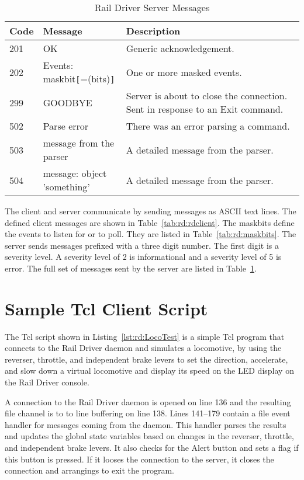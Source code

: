\begin{table}[hbpt]
\begin{centering}  
\begin{tabular}{|l|l|p{2in}|}
\hline
\textbf{Code} & \textbf{Message} & \textbf{Description} \\
\hline
\hline
201 & OK & Generic acknowledgement.\\
\hline
202 & Events: maskbit\verb=[==(bits)\verb=]=& One or more masked events.\\
\hline
299 & GOODBYE & Server is about to close the connection.  Sent in
response to an Exit command.\\
\hline
502 & Parse error& There was an error parsing a command.\\
\hline
503 & message from the parser& A detailed message from the parser.\\
\hline
504 & message: object 'something'& A detailed message from the parser.\\
\hline
\end{tabular}
\caption{Rail Driver Server Messages}
\label{tab:rd:rdserver}
\end{centering}
\end{table}
The client and server communicate by sending messages as ASCII text
lines.  The defined client messages are shown in
Table~\ref{tab:rd:rdclient}. The maskbits define the events to listen for
or to poll.  They are listed in Table~\ref{tab:rd:maskbits}. The server
sends messages prefixed with a three digit number.  The first digit is a
severity level. A severity level of 2 is informational and a
severity level of 5 is error.  The full set of messages sent by the
server are listed in Table~\ref{tab:rd:rdserver}.

\section{Sample Tcl Client Script}


The Tcl script shown in Listing~\ref{lst:rd:LocoTest} is a simple Tcl program
that connects to the Rail Driver daemon and simulates a locomotive, by
using the reverser, throttle, and independent brake levers to set the
direction, accelerate, and slow down a virtual locomotive and display
its speed on the LED display on the Rail Driver console.

A connection to the Rail Driver daemon is opened on line 136 and the
resulting file channel is to to line buffering on line 138.  Lines
141--179 contain a file event handler for messages coming from the
daemon.  This handler parses the results and updates the global state
variables based on changes in the reverser, throttle, and independent
brake levers.  It also checks for the Alert button and sets a flag if
this button is pressed.  If it looses the connection to the server, it
closes the connection and arrangings to exit the program.

